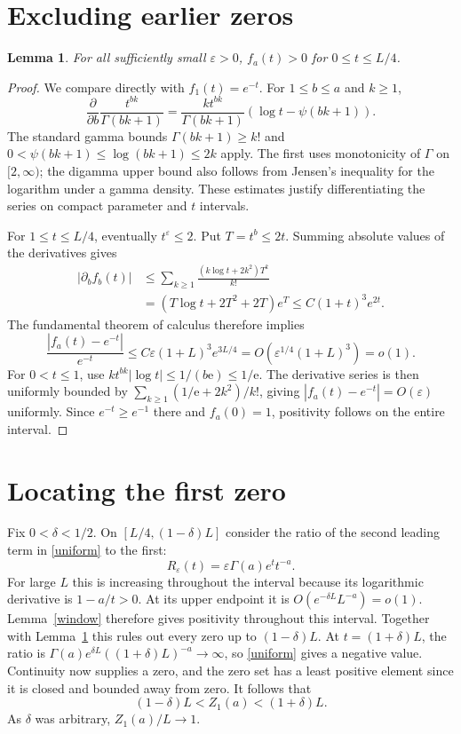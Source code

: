\documentclass[11pt]{article}
\newtheorem{lemma}{Lemma}
\begin{document}
\section*{Excluding earlier zeros}
\begin{lemma}\label{early}
For all sufficiently small $\varepsilon>0$, $f_a(t)>0$ for
$0\leq t\leq L/4$.
\end{lemma}
\begin{proof}
We compare directly with $f_1(t)=e^{-t}$. For $1\leq b\leq a$
and $k\geq1$,
\[
 \frac{\partial}{\partial b}
 \frac{t^{bk}}{\Gamma(bk+1)}
 =\frac{k t^{bk}}{\Gamma(bk+1)}
                         (\log t-\psi(bk+1)).
\]
The standard gamma bounds $\Gamma(bk+1)\geq k!$ and
$0<\psi(bk+1)\leq\log(bk+1)\leq2k$ apply. The first uses
monotonicity of $\Gamma$ on $[2,\infty)$; the digamma upper bound
also follows from Jensen's inequality for the logarithm under a
gamma density. These estimates justify differentiating the series
on compact parameter and $t$ intervals.

For $1\leq t\leq L/4$, eventually $t^\varepsilon\leq2$.
Put $T=t^b\leq2t$. Summing absolute values of the derivatives gives
\begin{align*}
 |\partial_b f_b(t)|
 &\leq\sum_{k\geq1}\frac{(k\log t+2k^2)T^k}{k!}\\
 &=(T\log t+2T^2+2T)e^T
 \leq C(1+t)^3e^{2t}.
\end{align*}
The fundamental theorem of calculus therefore implies
\[
 \frac{|f_a(t)-e^{-t}|}{e^{-t}}
 \leq C\varepsilon(1+L)^3e^{3L/4}
 =O(\varepsilon^{1/4}(1+L)^3)=o(1).
\]
For $0<t\leq1$, use
$k t^{bk}|\log t|\leq1/(b\mathrm e)\leq1/\mathrm e$.
The derivative series is then uniformly bounded by
$\sum_{k\geq1}(1/\mathrm e+2k^2)/k!$, giving
$|f_a(t)-e^{-t}|=O(\varepsilon)$ uniformly. Since $e^{-t}\geq e^{-1}$
there and $f_a(0)=1$, positivity follows on the entire interval.
\end{proof}

\section*{Locating the first zero}
Fix $0<\delta<1/2$. On $[L/4,(1-\delta)L]$ consider the ratio
of the second leading term in \eqref{uniform} to the first:
\[
 R_\varepsilon(t)=\varepsilon\Gamma(a)e^t t^{-a}.
\]
For large $L$ this is increasing throughout the interval because
its logarithmic derivative is $1-a/t>0$. At its upper endpoint
it is $O(e^{-\delta L}L^{-a})=o(1)$. Lemma~\ref{window}
therefore gives positivity throughout this interval. Together with
Lemma~\ref{early} this rules out every zero up to $(1-\delta)L$.
At $t=(1+\delta)L$, the ratio is
$\Gamma(a)e^{\delta L}((1+\delta)L)^{-a}\to\infty$, so
\eqref{uniform} gives a negative value. Continuity now supplies a
zero, and the zero set has a least positive element since it is
closed and bounded away from zero. It follows that
\[
 (1-\delta)L<Z_1(a)<(1+\delta)L.
\]
As $\delta$ was arbitrary, $Z_1(a)/L\to1$.
\end{document}
